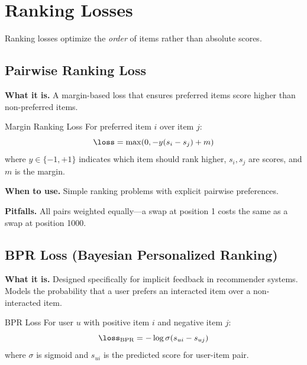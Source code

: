 \section{Ranking Losses}
\label{sec:ranking_losses}

Ranking losses optimize the \textit{order} of items rather than absolute scores.

\subsection{Pairwise Ranking Loss}

\textbf{What it is.} A margin-based loss that ensures preferred items score higher than non-preferred items.

\begin{mathresult}{Margin Ranking Loss}
For preferred item $i$ over item $j$:
\begin{equation}
\loss = \max(0, -y(s_i - s_j) + m)
\end{equation}
where $y \in \{-1, +1\}$ indicates which item should rank higher, $s_i, s_j$ are scores, and $m$ is the margin.
\end{mathresult}

\textbf{When to use.} Simple ranking problems with explicit pairwise preferences.

\textbf{Pitfalls.} All pairs weighted equally---a swap at position 1 costs the same as a swap at position 1000.

\subsection{BPR Loss (Bayesian Personalized Ranking)}

\textbf{What it is.} Designed specifically for implicit feedback in recommender systems. Models the probability that a user prefers an interacted item over a non-interacted item.

\begin{mathresult}{BPR Loss}
For user $u$ with positive item $i$ and negative item $j$:
\begin{equation}
\loss_{\text{BPR}} = -\log \sigma(s_{ui} - s_{uj})
\end{equation}
where $\sigma$ is sigmoid and $s_{ui}$ is the predicted score for user-item pair.
\end{mathresult}

